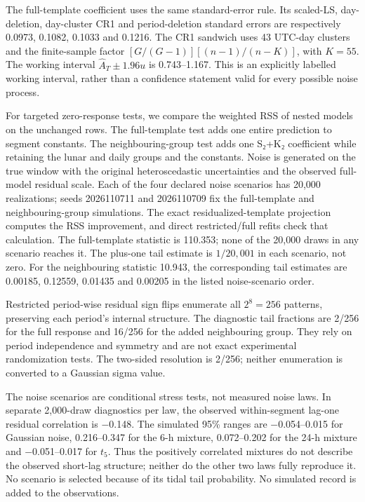 \documentclass[
  12pt,
  a4paper,
]{article}
\begin{document}
The full-template coefficient uses the same standard-error rule. Its
scaled-LS, day-deletion, day-cluster CR1 and period-deletion standard
errors are respectively 0.0973, 0.1082, 0.1033 and 0.1216. The CR1
sandwich uses 43 UTC-day clusters and the finite-sample factor
\([G/(G-1)][(n-1)/(n-K)]\), with \(K=55\). The working interval
\(\widehat A_T\pm1.96u\) is 0.743--1.167. This is an explicitly labelled
working interval, rather than a confidence statement valid for every
possible noise process.

For targeted zero-response tests, we compare the weighted RSS of nested
models on the unchanged rows. The full-template test adds one entire
prediction to segment constants. The neighbouring-group test adds one
S₂+K₂ coefficient while retaining the lunar and daily groups and the
constants. Noise is generated on the true window with the original
heteroscedastic uncertainties and the observed full-model residual
scale. Each of the four declared noise scenarios has 20,000
realizations; seeds 2026110711 and 2026110709 fix the full-template and
neighbouring-group simulations. The exact residualized-template
projection computes the RSS improvement, and direct restricted/full
refits check that calculation. The full-template statistic is 110.353;
none of the 20,000 draws in any scenario reaches it. The plus-one tail
estimate is \(1/20,001\) in each scenario, not zero. For the
neighbouring statistic 10.943, the corresponding tail estimates are
0.00185, 0.12559, 0.01435 and 0.00205 in the listed noise-scenario
order.

Restricted period-wise residual sign flips enumerate all \(2^8=256\)
patterns, preserving each period's internal structure. The diagnostic
tail fractions are 2/256 for the full response and 16/256 for the added
neighbouring group. They rely on period independence and symmetry and
are not exact experimental randomization tests. The two-sided resolution
is 2/256; neither enumeration is converted to a Gaussian sigma value.

The noise scenarios are conditional stress tests, not measured noise
laws. In separate 2,000-draw diagnostics per law, the observed
within-segment lag-one residual correlation is −0.148. The simulated
95\% ranges are −0.054--0.015 for Gaussian noise, 0.216--0.347 for the
6-h mixture, 0.072--0.202 for the 24-h mixture and −0.051--0.017 for
\(t_5\). Thus the positively correlated mixtures do not describe the
observed short-lag structure; neither do the other two laws fully
reproduce it. No scenario is selected because of its tidal tail
probability. No simulated record is added to the observations.
\end{document}
